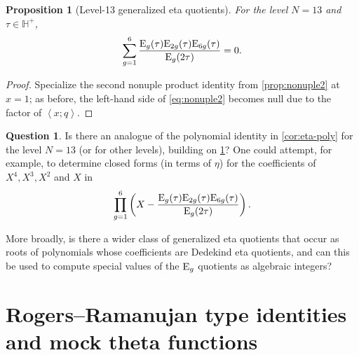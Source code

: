 \documentclass[reqno,11pt]{amsart}
\newtheorem{proposition}[theorem]{Proposition}
\theoremstyle{definition}
\newtheorem{question}{Question}
\theoremstyle{remark}
\numberwithin{equation}{section}
\renewcommand{\H}{{\mathbb{H}}}
\newcommand{\E}{\textnormal E}
\newcommand{\la}{\left\langle}
\newcommand{\ra}{\right\rangle}
\newcommand{\fix}[1]{\textcolor{blue}{\large (#1)\normalsize}}
\begin{document}
\begin{proposition}[Level-13 generalized eta quotients] \label{prop:level-13}
For the level $N = 13$ and $\tau \in \H^+$,
\[
\sum_{g=1}^6
\frac{\E_{g}(\tau)\E_{2g}(\tau)\E_{6g}(\tau)}{\E_g(2\tau)} = 0.
\]
\end{proposition}

\begin{proof}
Specialize the second nonuple product identity from \cref{prop:nonuple2} at $x = 1$; as before, the left-hand side of \cref{eq:nonuple2} becomes null due to the factor of $\la x; q \ra$.
\end{proof}

\begin{question}
Is there an analogue of the polynomial identity in \cref{cor:eta-poly} for the level $N = 13$ (or for other levels), building on \cref{prop:level-13}? One could attempt, for example, to determine closed forms (in terms of $\eta$) for the coefficients of $X^4, X^3, X^2$ and $X$ in
\[
    \prod_{g=1}^6 \left(X -
    \frac{\E_{g}(\tau)\E_{2g}(\tau)\E_{6g}(\tau)}{\E_g(2\tau)}\right).
\]


More broadly, is there a wider class of generalized eta quotients that occur as roots of polynomials whose coefficients are Dedekind eta quotients, and can this be used to compute special values of the $\E_g$ quotients as algebraic integers?
\end{question}







\section{Rogers--Ramanujan type identities and mock theta functions}\label{sec:rog-ram}

\end{document}
